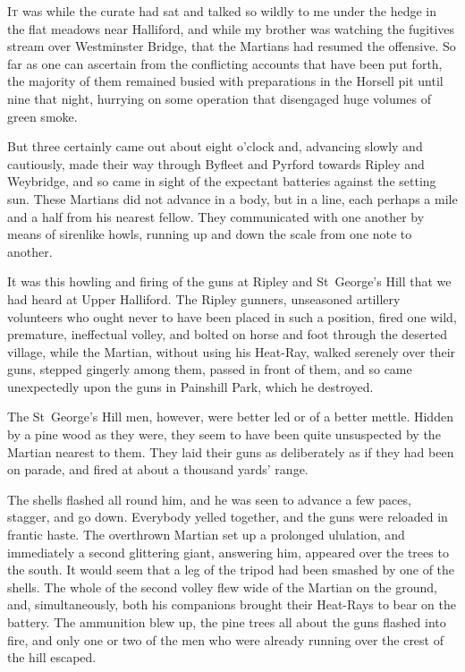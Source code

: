 

\lettrine[lines=4,findent=2pt]{I}{t} was while the curate had sat and talked so wildly to me under the hedge in the flat meadows near Halliford, and while my brother was watching the fugitives stream over Westminster Bridge, that the Martians had resumed the offensive. So far as one can ascertain from the conflicting accounts that have been put forth, the majority of them remained busied with preparations in the Horsell pit until nine that night, hurrying on some operation that disengaged huge volumes of green smoke.

But three certainly came out about eight o'clock and, advancing slowly and cautiously, made their way through Byfleet and Pyrford towards Ripley and Weybridge, and so came in sight of the expectant batteries against the setting sun. These Martians did not advance in a body, but in a line, each perhaps a mile and a half from his nearest fellow. They communicated with one another by means of sirenlike howls, running up and down the scale from one note to another.

It was this howling and firing of the guns at Ripley and St~George's Hill that we had heard at Upper Halliford. The Ripley gunners, unseasoned artillery volunteers who ought never to have been placed in such a position, fired one wild, premature, ineffectual volley, and bolted on horse and foot through the deserted village, while the Martian, without using his Heat-Ray, walked serenely over their guns, stepped gingerly among them, passed in front of them, and so came unexpectedly upon the guns in Painshill Park, which he destroyed.

The St~George's Hill men, however, were better led or of a better mettle. Hidden by a pine wood as they were, they seem to have been quite unsuspected by the Martian nearest to them. They laid their guns as deliberately as if they had been on parade, and fired at about a thousand yards' range.

The shells flashed all round him, and he was seen to advance a few paces, stagger, and go down. Everybody yelled together, and the guns were reloaded in frantic haste. The overthrown Martian set up a prolonged ululation, and immediately a second glittering giant, answering him, appeared over the trees to the south. It would seem that a leg of the tripod had been smashed by one of the shells. The whole of the second volley flew wide of the Martian on the ground, and, simultaneously, both his companions brought their Heat-Rays to bear on the battery. The ammunition blew up, the pine trees all about the guns flashed into fire, and only one or two of the men who were already running over the crest of the hill escaped.

